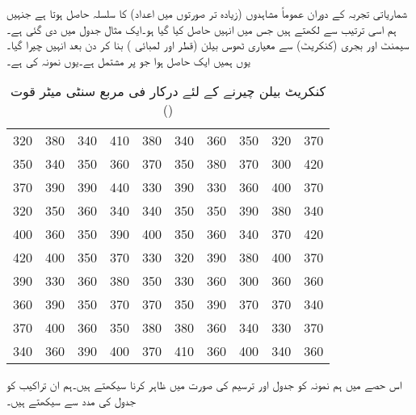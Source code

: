شماریاتی تجربہ کے دوران عموماً مشاہدوں (زیادہ تر صورتوں میں اعداد) کا سلسلہ حاصل ہوتا ہے جنہیں ہم اسی ترتیب سے لکھتے ہیں جس میں انہیں حاصل کیا گیا ہو۔ایک مثال جدول  میں دی گئی ہے۔سیمنٹ اور بجری (کنکریٹ) سے معیاری ٹھوس بیلن (قطر  اور لمبائی ) بنا کر  دن بعد انہیں چیرا گیا۔یوں ہمیں ایک  حاصل ہوا جو   پر مشتمل ہے۔یوں نمونہ کی   ہے۔  
\begin{table}
\caption{کنکریٹ بیلن چیرنے کے لئے درکار فی مربع سنٹی میٹر قوت ()}
\label{جدول_شماریات_کنکریٹ_بیلن}
\begin{otherlanguage}{english}
\centering
\begin{tabular}{CCCCCCCCCC}
320&380&340&410&380&340&360&350&320&370\\
350&340&350&360&370&350&380&370&300&420\\
370&390&390&440&330&390&330&360&400&370\\
320&350&360&340&340&350&350&390&380&340\\
400&360&350&390&400&350&360&340&370&420\\
420&400&350&370&330&320&390&380&400&370\\
390&330&360&380&350&330&360&300&360&360\\
360&390&350&370&370&350&390&370&370&340\\
370&400&360&350&380&380&360&340&330&370\\
340&360&390&400&370&410&360&400&340&360
\end{tabular}
\end{otherlanguage}
\end{table}

اس حصے میں ہم نمونہ کو جدول اور ترسیم کی صورت میں ظاہر کرنا سیکھتے ہیں۔ہم ان تراکیب کو جدول  کی مدد سے سیکھتے ہیں۔


